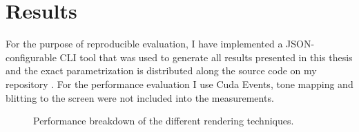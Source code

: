 
\chapter{Results}
\label{chap:results}
For the purpose of reproducible evaluation, I have implemented a JSON-configurable CLI tool that was used to generate all results presented in this thesis and the exact parametrization is distributed along the source code on my repository \parencite{stamm2025}.
For the performance evaluation I use Cuda Events, tone mapping and blitting to the screen were not included into the measurements.

\begin{figure}
    \centering
    
    \caption{Performance breakdown of the different rendering techniques.}
    \label{fig:breakdown}
\end{figure}